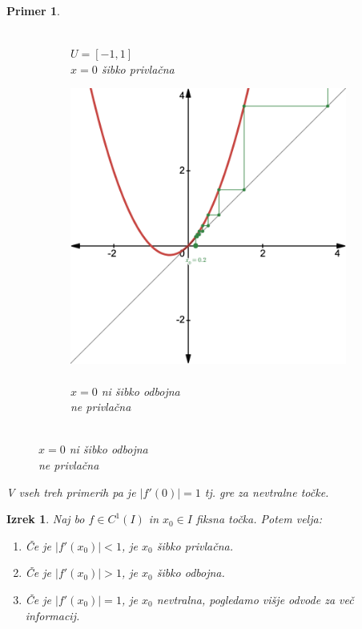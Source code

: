 \documentclass{article}
\newtheorem{primer}{Primer}
\newtheorem{izrek}{Izrek}
\begin{document}
\begin{primer}
\begin{figure}[h]
\begin{subfigure}[b]{0.3\textwidth}
            \caption{\\$U = [-1,1]$\\$x=0$ šibko privlačna}
            \label{fig:cobweb32}
        \end{subfigure}
        \begin{subfigure}[b]{0.3\textwidth}
            \centering
            \includegraphics[width=\textwidth]{Grafi/cobweb43.png}
            \caption{\\$x=0$ ni šibko odbojna\\ ne privlačna}
            \label{fig:cobweb33}
        \end{subfigure}
    \end{figure}
V vseh treh primerih pa je $|f'(0)| = 1$ tj. gre za nevtralne točke.
\end{primer}

\begin{izrek}
Naj bo $f\in C^1(I)$ in $x_0 \in I$ fiksna točka. Potem velja:
\begin{enumerate}
\item[i)] Če je $|f'(x_0)| < 1$, je $x_0$ šibko privlačna.
\item[ii)] Če je $|f'(x_0)| > 1$, je $x_0$ šibko odbojna. 
\item[iii)] Če je $|f'(x_0)| = 1$, je $x_0$ nevtralna, pogledamo višje odvode za več informacij.
\end{enumerate}
\end{izrek}
\end{document}
